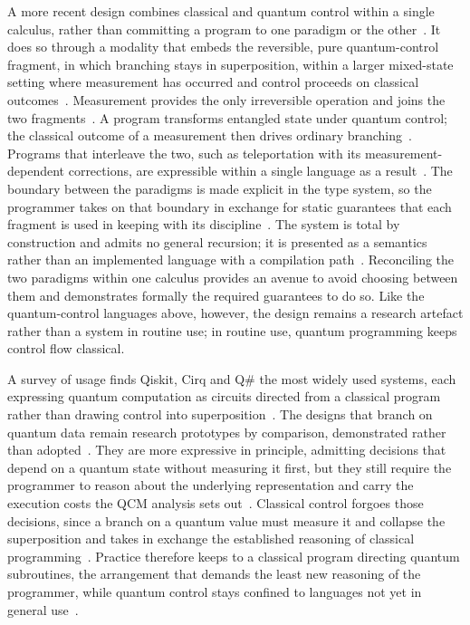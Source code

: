 A more recent design combines classical and quantum control within a single calculus, rather than committing a program to one paradigm or the other~\cite{dave2025combining}.
It does so through a modality that embeds the reversible, pure quantum-control fragment, in which branching stays in superposition, within a larger mixed-state setting where measurement has occurred and control proceeds on classical outcomes~\cite{dave2025combining}.
Measurement provides the only irreversible operation and joins the two fragments~\cite{dave2025combining}.
A program transforms entangled state under quantum control; the classical outcome of a measurement then drives ordinary branching~\cite{dave2025combining}.
Programs that interleave the two, such as teleportation with its measurement-dependent corrections, are expressible within a single language as a result~\cite{dave2025combining}.
The boundary between the paradigms is made explicit in the type system, so the programmer takes on that boundary in exchange for static guarantees that each fragment is used in keeping with its discipline~\cite{dave2025combining}.
The system is total by construction and admits no general recursion; it is presented as a semantics rather than an implemented language with a compilation path~\cite{dave2025combining}.
Reconciling the two paradigms within one calculus provides an avenue to avoid choosing between them and demonstrates formally the required guarantees to do so.
Like the quantum-control languages above, however, the design remains a research artefact rather than a system in routine use; in routine use, quantum programming keeps control flow classical.

A survey of usage finds Qiskit, Cirq and Q\# the most widely used systems, each expressing quantum computation as circuits directed from a classical program rather than drawing control into superposition~\cite{ferreira2024qplusage}.
The designs that branch on quantum data remain research prototypes by comparison, demonstrated rather than adopted~\cite{mints2025qunity, diazcaro2025lambdasx}.
They are more expressive in principle, admitting decisions that depend on a quantum state without measuring it first, but they still require the programmer to reason about the underlying representation and carry the execution costs the QCM analysis sets out~\cite{yuan2025foundationalabstractions}.
Classical control forgoes those decisions, since a branch on a quantum value must measure it and collapse the superposition and takes in exchange the established reasoning of classical programming~\cite{selinger2004towards}.
Practice therefore keeps to a classical program directing quantum subroutines, the arrangement that demands the least new reasoning of the programmer, while quantum control stays confined to languages not yet in general use~\cite{ferreira2024qplusage}.

